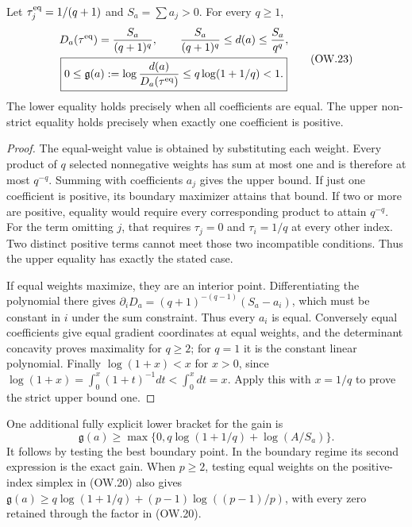\begin{theorem}
Let $\tau^{\rm eq}_j=1/(q+1)$ and $S_a=\sum a_j>0$.
For every $q\ge1$,
\[
 \begin{gathered}
 D_a(\tau^{\rm eq})=\frac{S_a}{(q+1)^q},\qquad
 \frac{S_a}{(q+1)^q}\le d(a)\le\frac{S_a}{q^q},\\
 \boxed{0\le\mathfrak g(a):=
 \log\frac{d(a)}{D_a(\tau^{\rm eq})}
 \le q\log(1+1/q)<1.}
 \end{gathered}                                           \tag{OW.23}
\]
The lower equality holds precisely when all coefficients are equal.
The upper non-strict equality holds precisely when exactly one
coefficient is positive.
\end{theorem}
\begin{proof}
The equal-weight value is obtained by substituting each weight.
Every product of $q$ selected nonnegative weights has sum at most
one and is therefore at most $q^{-q}$. Summing with coefficients
$a_j$ gives the upper bound. If just one coefficient is positive,
its boundary maximizer attains that bound. If two or more are
positive, equality would require every corresponding product to
attain $q^{-q}$. For the term omitting $j$, that requires
$\tau_j=0$ and $\tau_i=1/q$ at every other index. Two distinct
positive terms cannot meet those two incompatible conditions.
Thus the upper equality has exactly the stated case.

If equal weights maximize, they are an interior point. Differentiating
the polynomial there gives
$\partial_iD_a=(q+1)^{-(q-1)}(S_a-a_i)$, which must be constant
in $i$ under the sum constraint. Thus every $a_i$ is equal.
Conversely equal coefficients give equal gradient coordinates at
equal weights, and the determinant concavity proves maximality
for $q\ge2$; for $q=1$ it is the constant linear polynomial.
Finally $\log(1+x)<x$ for $x>0$, since
$\log(1+x)=\int_0^x(1+t)^{-1}dt<\int_0^xdt=x$.
Apply this with $x=1/q$ to prove the strict upper bound one.
\end{proof}

One additional fully explicit lower bracket for the gain is
\[
 \mathfrak g(a)\ge
 \max\{0,q\log(1+1/q)+\log(A/S_a)\}.                    \tag{OW.24}
\]
It follows by testing the best boundary point. In the boundary
regime its second expression is the exact gain. When $p\ge2$,
testing equal weights on the positive-index simplex in (OW.20)
also gives
$\mathfrak g(a)\ge q\log(1+1/q)
+(p-1)\log((p-1)/p)$, with every zero retained through the
factor in (OW.20).

